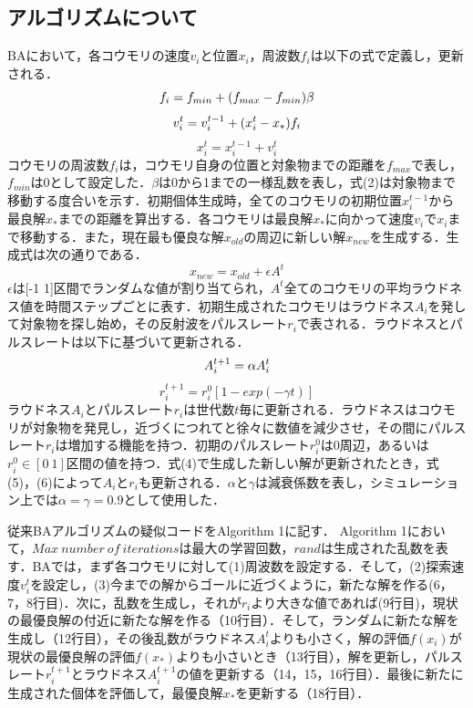 \documentclass{jarticle}
\begin{document}
\subsection{アルゴリズムについて}
BAにおいて，各コウモリの速度${v_i}$と位置${x_i}$，周波数${f_i}$は以下の式で定義し，更新される．
\begin{equation}
f_i=f_{min} + (f_{max} - f_{min}) \beta\\
\end{equation}
\begin{equation}
v_i^t=v_i^{t-1}+(x_i^t-x_*) f_i\\
\end{equation}
\begin{equation}
\label{eq:generation}
x_i^t=x_i^{t-1}+v_i^t
\end{equation}
コウモリの周波数${f_i}$は，コウモリ自身の位置と対象物までの距離を${f_{max}}$で表し，${f_{min}}$は0として設定した．$ \beta $は0から1までの一様乱数を表し，式(2)は対象物まで移動する度合いを示す．初期個体生成時，全てのコウモリの初期位置${x_i^{t-1}}$から最良解${x_*}$までの距離を算出する．各コウモリは最良解${x_*}$に向かって速度${v_i}$で${x_i}$まで移動する．また，現在最も優良な解$x_{old}$の周辺に新しい解$x_{new}$を生成する．生成式は次の通りである．
\begin{equation}
\label{eq:production}
x_{new}=x_{old}+\epsilon A^t
\end{equation}
$ \epsilon $は[-1 1]区間でランダムな値が割り当てられ，${A^t}$全てのコウモリの平均ラウドネス値を時間ステップごとに表す．初期生成されたコウモリはラウドネス${A_i}$を発して対象物を探し始め，その反射波をパルスレート${r_i}$で表される．ラウドネスとパルスレートは以下に基づいて更新される．
\begin{equation}
A_i^{t+1}=\alpha A_i^t\\
\end{equation}
\begin{equation}
r_i^{t+1}=r_i^0 [1-exp(-\gamma t)]
\end{equation}
ラウドネス${A_i}$とパルスレート${r_i}$は世代数${t}$毎に更新される．ラウドネスはコウモリが対象物を発見し，近づくにつれてと徐々に数値を減少させ，その間にパルスレート${r_i}$は増加する機能を持つ．初期のパルスレート${r_i^0}$は0周辺，あるいは${r_i^0\in[0\ 1]}$区間の値を持つ．式(4)で生成した新しい解が更新されたとき，式(5)，(6)によって${A_i}$と${r_i}$も更新される．$ \alpha $と$ \gamma $は減衰係数を表し，シミュレーション上では${\alpha=\gamma=0.9}$として使用した．\par 従来BAアルゴリズムの疑似コードをAlgorithm 1に記す． 
Algorithm 1において，$Max\ number\ of\ iterations$は最大の学習回数，$rand$は生成された乱数を表す．BAでは，まず各コウモリに対して(1)周波数を設定する．そして，(2)探索速度$v_i^t$を設定し，(3)今までの解からゴールに近づくように，新たな解を作る(6，7，8行目)．次に，乱数を生成し，それが$r_i$より大きな値であれば(9行目)，現状の最優良解の付近に新たな解を作る（10行目）．そして，ランダムに新たな解を生成し（12行目），その後乱数がラウドネス$A_i^t$よりも小さく，解の評価$f(x_i)$が現状の最優良解の評価$f(x_*)$よりも小さいとき（13行目），解を更新し，パルスレート$r_i^{t+1}$とラウドネス$A_i^{t+1}$の値を更新する（14，15，16行目）．最後に新たに生成された個体を評価して，最優良解$x_*$を更新する（18行目）．\\
\end{document}

